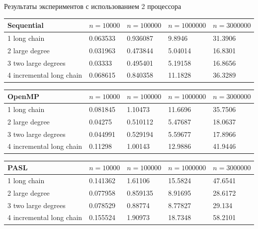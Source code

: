 \documentclass[hyperref=unicode,graphics=pdflatex,13pt]{beamer}
\begin{document}
\begin{frame}[shrink]{Результаты экспериментов с использованием 2 процессора}

\begin{table}[!ht]
\centering
\begin{tabular}{|l|l|l|l|l|}\hline
Sequential	& $n=10000$ & $n=100000$ & $n=1000000$ & $n=3000000$ \\\hline
1 long chain & 0.063533	& 0.936087 & 9.8946 & 31.3906 \\\hline
2 large degree & 0.031963 & 0.473844 & 5.04014 & 16.8301 \\\hline
3 two large degrees & 0.03333 & 0.495401 & 5.19158 & 16.8656 \\\hline
4 incremental long chain & 0.068615 & 0.840358 & 11.1828 & 36.3289 \\\hline
\end{tabular}
\end{table}

\begin{table}[!ht]
\centering
\begin{tabular}{|l|l|l|l|l|}\hline
OpenMP	& $n=10000$ & $n=100000$ & $n=1000000$ & $n=3000000$ \\\hline
1 long chain & 0.081845 & 1.10473 & 11.6696 & 35.7506 \\\hline
2 large degree & 0.04275 & 0.510112 & 5.47687 & 18.0637 \\\hline
3 two large degrees & 0.044991 & 0.529194 & 5.59677 & 17.8966 \\\hline
4 incremental long chain & 0.11298 & 1.00143 & 12.9886 & 41.9446 \\\hline
\end{tabular}
\end{table}

\begin{table}[!ht]
\centering
\begin{tabular}{|l|l|l|l|l|}\hline

PASL	& $n=10000$ & $n=100000$ & $n=1000000$ & $n=3000000$ \\\hline
1 long chain & 0.141362	& 1.61106 & 15.5824 & 47.6541 \\\hline
2 large degree & 0.077958 & 0.859135 & 8.91695 & 28.6172 \\\hline
3 two large degrees & 0.078529 & 0.88774 & 8.77827 & 29.134 \\\hline
4 incremental long chain & 0.155524 & 1.90973 & 18.7348 & 58.2101 \\\hline
\end{tabular}
\end{table}
\end{frame}
\end{document}
